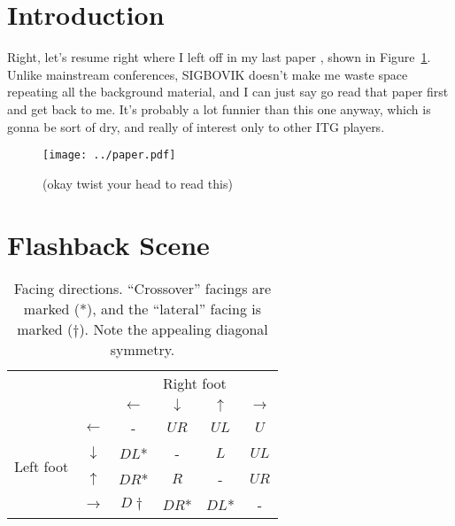 \documentclass[10pt]{sigplanconf}
\begin{document}
\section{Introduction}

Right, let's resume right where I left off in my last paper \cite{turniness}, shown in Figure~\ref{fig:you-stutid-fuckass}.
Unlike mainstream conferences, SIGBOVIK doesn't make me waste space repeating all the background material,
and I can just say go read that paper first and get back to me.
It's probably a lot funnier than this one anyway, which is gonna be sort of dry, and really of interest only to other ITG players.

\begin{figure}[h]
	\texttt{[image: ../paper.pdf]}
	\caption{(okay twist your head to read this)}
	\label{fig:you-stutid-fuckass}
\end{figure}



\section{Flashback Scene}


\begin{table}[h]
	\begin{center}
	\begin{tabular}{cc|cccc}
		& & \multicolumn{4}{c}{Right foot} \\
		& & $\leftarrow$ & $\downarrow$ & $\uparrow$ & $\rightarrow$ \\
		\hline
		\multirow{4}{*}{Left foot}
		& $\leftarrow$  & - & $UR$ & $UL$ & $U$ \\
		& $\downarrow$  & $DL$* & - & $L$ & $UL$ \\
		& $\uparrow$    & $DR$* & $R$ & - & $UR$ \\
		& $\rightarrow$ & $D\dagger$ & $DR$* & $DL$* & - \\

	\end{tabular}
	\end{center}
	\caption{Facing directions. ``Crossover'' facings are marked (*), and the ``lateral'' facing is marked ($\dagger$). Note the appealing diagonal symmetry.}
	\label{tab:facing}
\end{table}

\end{document}
